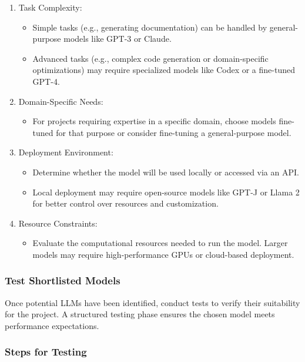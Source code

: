 \documentclass[14pt, a4paper]{article}
\begin{document}
\begin{enumerate}
    \item Task Complexity:
    \begin{itemize}
        \item Simple tasks (e.g., generating documentation) can be handled by
        general-purpose models like GPT-3 or Claude.
        \item Advanced tasks (e.g., complex code generation or domain-specific
        optimizations) may require specialized models like Codex or a fine-tuned
        GPT-4.
    \end{itemize}
    \item Domain-Specific Needs:
    \begin{itemize}
        \item For projects requiring expertise in a specific domain, choose
        models fine-tuned for that purpose or consider fine-tuning a
        general-purpose model.
    \end{itemize}
    \item Deployment Environment:
    \begin{itemize}
        \item Determine whether the model will be used locally or accessed via
        an API.
        \item Local deployment may require open-source models like GPT-J or
        Llama 2 for better control over resources and customization.
    \end{itemize}
    \item Resource Constraints:
    \begin{itemize}
        \item Evaluate the computational resources needed to run the model.
        Larger models may require high-performance GPUs or cloud-based
        deployment.
    \end{itemize}
\end{enumerate}

\subsubsection{Test Shortlisted Models}

Once potential LLMs have been identified, conduct tests to verify their
suitability for the project. A structured testing phase ensures the chosen model
meets performance expectations.

\subsubsection*{Steps for Testing}
\end{document}
